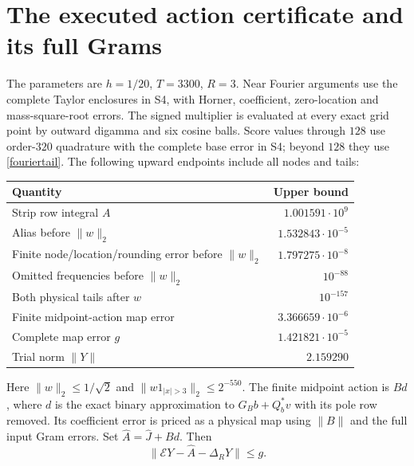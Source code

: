 \documentclass[11pt]{article}
\numberwithin{equation}{section}
\begin{document}
\section{The executed action certificate and its full Grams}\label{action}
The parameters are $h=1/20$, $T=3300$, $R=3$. Near Fourier arguments
use the complete Taylor enclosures in S4, with Horner, coefficient,
zero-location and mass-square-root errors. The signed multiplier is
evaluated at every exact grid point by outward digamma and six cosine
balls. Score values through $128$ use order-$320$ quadrature with the
complete base error in S4; beyond $128$ they use \eqref{fouriertail}.
The following upward endpoints include all nodes and tails:
\begin{center}
\begin{tabular}{lr}
Quantity & Upper bound\\\hline
Strip row integral $A$ & $1.001591\cdot10^9$\\
Alias before $\|w\|_2$ & $1.532843\cdot10^{-5}$\\
Finite node/location/rounding error before $\|w\|_2$
 & $1.797275\cdot10^{-8}$\\
Omitted frequencies before $\|w\|_2$ & $10^{-88}$\\
Both physical tails after $w$ & $10^{-157}$\\
Finite midpoint-action map error & $3.366659\cdot10^{-6}$\\
Complete map error $g$ & $1.421821\cdot10^{-5}$\\
Trial norm $\|Y\|$ & $2.159290$
\end{tabular}
\end{center}
Here $\|w\|_2\le1/\sqrt2$ and
$\|w1_{|x|>3}\|_2\le2^{-550}$. The finite midpoint action is
$Bd$, where $d$ is the exact binary approximation to
$G_Bb+Q_b^*v$ with its pole row removed. Its coefficient error is
priced as a physical map using $\|B\|$ and the full input Gram errors.
Set $\widehat A=\widehat J+Bd$. Then
\begin{equation}\label{actionpremise}
 \|\mathcal EY-\widehat A-\Delta_RY\|\le g.
\end{equation}
\end{document}
